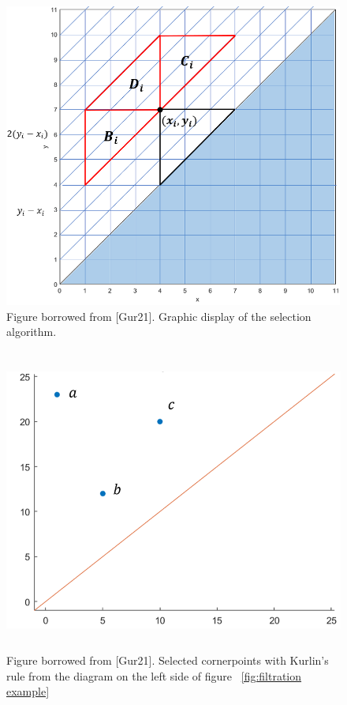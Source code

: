 \documentclass[english, LaM, oneside, noexaminfo]{sapthesis}
\begin{document}
\begin{figure}[tb]
\centering
\includegraphics[height=10cm]{Ziggurat algorithm.png}
\caption{Figure borrowed from [Gur21]. Graphic display of the selection algorithm.}\label{fig:Ziggurat algorithm}
\end{figure}


\begin{figure}[tb]
\centering
\includegraphics[height=10cm]{Kurlin selection.png}
\caption{Figure borrowed from [Gur21]. Selected cornerpoints with Kurlin's rule from the diagram on the left side of figure ~\ref{fig:filtration example}}\label{fig:Kurlin selection}
\end{figure}
\end{document}
